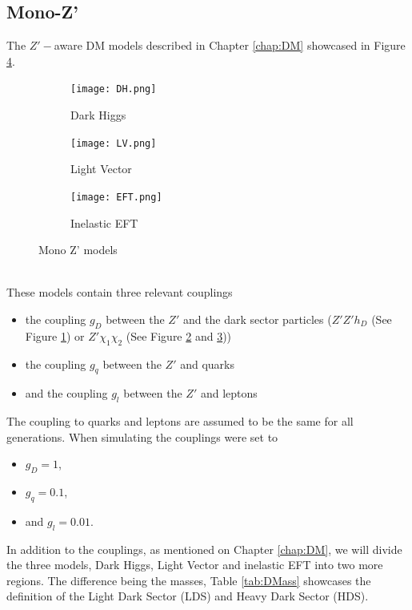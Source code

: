 \documentclass[12pt, a4paper]{book}
\begin{document}
\subsection{Mono-Z'}
The $Z'-$aware DM models described in Chapter \ref{chap:DM} showcased in Figure \ref{fig:monoZp}. 
\begin{figure}[!ht]
    \centering 
    \begin{subfigure}[b]{0.3\textwidth}
        \centering
        \texttt{[image: DH.png]}
        \caption{Dark Higgs}\label{fig:DH_5}
    \end{subfigure}
    \hfill
    \begin{subfigure}[b]{0.3\textwidth}
        \centering
        \texttt{[image: LV.png]}
        \caption{Light Vector}\label{fig:LV_5}
    \end{subfigure}
    \hfill
    \begin{subfigure}[b]{0.3\textwidth}
        \centering
        \texttt{[image: EFT.png]}
        \caption{Inelastic EFT}\label{fig:EFT_5}
    \end{subfigure}
    \caption{Mono Z' models}\label{fig:monoZp}
\end{figure}
\\These models contain three relevant couplings
\begin{itemize}
    \item the coupling $g_D$ between the $Z'$ and the dark sector particles ($Z'Z'h_D$ (See Figure \ref{fig:DH_5}) or $Z'\chi_1\chi_2$ (See Figure \ref{fig:LV_5} and \ref{fig:EFT_5}))
    \item the coupling $g_q$ between the $Z'$ and quarks
    \item and the coupling $g_l$ between the $Z'$ and leptons
\end{itemize}
The coupling to quarks and leptons are assumed to be the same for all generations. When simulating the couplings were set to
\begin{itemize}
    \item $g_D = 1$,
    \item $g_q=0.1$,
    \item and $g_l=0.01$.
\end{itemize}
In addition to the couplings, as mentioned on Chapter \ref{chap:DM}, we will divide the three models, Dark Higgs, Light Vector and inelastic EFT into two more regions. The difference being the masses, Table \ref{tab:DMass} showcases the definition of the Light Dark Sector (LDS) and Heavy Dark Sector (HDS).
\end{document}

